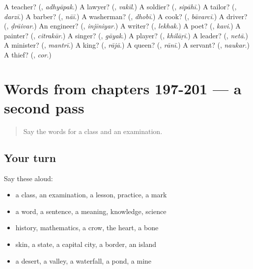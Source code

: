 \begin{tcolorbox}[breakable,colback=teal!4,colframe=teal!35!black,title={Before you move on}]
A teacher? (\textbf{}, \emph{adhyāpak}.) A lawyer? (\textbf{}, \emph{vakīl}.) A soldier? (\textbf{}, \emph{sipāhī}.) A tailor? (\textbf{}, \emph{darzī}.) A barber? (\textbf{}, \emph{nāī}.) A washerman? (\textbf{}, \emph{dhobī}.) A cook? (\textbf{}, \emph{bāvarcī}.) A driver? (\textbf{}, \emph{ḍrāivar}.) An engineer? (\textbf{}, \emph{injīniyar}.) A writer? (\textbf{}, \emph{lekhak}.) A poet? (\textbf{}, \emph{kavi}.) A painter? (\textbf{}, \emph{citrakār}.) A singer? (\textbf{}, \emph{gāyak}.) A player? (\textbf{}, \emph{khilāṛī}.) A leader? (\textbf{}, \emph{netā}.) A minister? (\textbf{}, \emph{mantrī}.) A king? (\textbf{}, \emph{rājā}.) A queen? (\textbf{}, \emph{rānī}.) A servant? (\textbf{}, \emph{naukar}.) A thief? (\textbf{}, \emph{cor}.)
\end{tcolorbox}
\section[(dialogue)]{Words from chapters 197-201 — a second pass}

\label{lesson:HI-R201-second-pass-words-from-chapters-197-201}



\begin{quote}
Say the words for a class and an examination.
\end{quote}

\subsection*{Your turn}
Say these aloud:

\begin{itemize}
\raggedright
  \item a class, an examination, a lesson, practice, a mark
  \item a word, a sentence, a meaning, knowledge, science
  \item history, mathematics, a crow, the heart, a bone
  \item skin, a state, a capital city, a border, an island
  \item a desert, a valley, a waterfall, a pond, a mine
\end{itemize}

